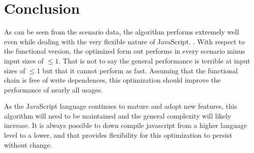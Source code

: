 \chapter{Conclusion}

As can be seen from the scenario data, the algorithm performs extremely well even while dealing with the very flexible nature of JavaScript.  . With respect to the functional version, the optimized form out performs in every scenario minus input sizes of $\leq 1$.  That is not to say the general performance is terrible at input sizes of $\leq 1$ but that it cannot perform as fast.  Assuming that the functional chain is free of write dependences, this optimization should improve the performance of nearly all usages.  

As the JavaScript language continues to mature and adopt new features, this algorithm will need to be maintained and the general complexity will likely increase.  It is always possible to down compile javascript from a higher language level to a lower, and that provides flexibility for this optimization to persist without change.